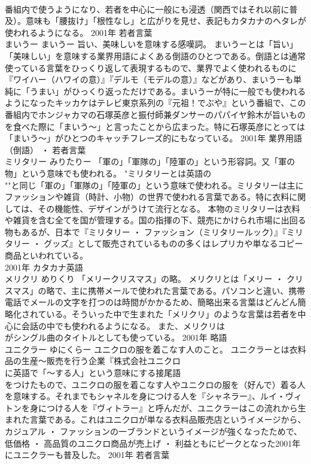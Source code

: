 \documentclass[8pt]{extreport}
\begin{document}
\begin{CJK}{UTF8}{min}
\\	番組内で使うようになり、若者を中心に一般にも浸透（関西ではそれ以前に普及）。意味も「腰抜け」「根性なし」と広がりを見せ、表記もカタカナのヘタレが使われるようになる。	2001年	若者言葉	
\\	まいうー	まいうー	旨い、美味しいを意味する感嘆詞。	まいうーとは「旨い」「美味しい」を意味する業界用語によくある倒語のひとつである。倒語とは通常使っている言葉をひっくり返して表現するもので、業界でよく使われるものに『ワイハー（ハワイの意）』『デルモ（モデルの意）』などがあり、まいうーも単純に「うまい」がひっくり返っただけである。まいうーが特に一般でも使われるようになったキッカケはテレビ東京系列の『元祖！でぶや』という番組で、この番組内でホンジャカマの石塚英彦と振付師兼ダンサーのパパイヤ鈴木が旨いものを食べた際に「まいう～」と言ったことから広まった。特に石塚英彦にとっては「まいう～」がひとつのキャッチフレーズ的にもなっている。	2001年	業界用語（倒語） ・ 若者言葉	
\\	ミリタリー	みりたりー	「軍の」「軍隊の」「陸軍の」という形容詞。又「軍の物」という意味でも使われる。	"ミリタリーとは英語の
\\	""と同じ「軍の」「軍隊の」「陸軍の」という意味で使われる。ミリタリーは主にファッションや雑貨（時計、小物）の世界で使われる言葉である。特に衣料に関しては、その機能性、デザインがうけて流行となる。 本物のミリタリーは衣料や雑貨を含む全てを国が管理する。国の指揮の下、競売にかけられ市場に出回る物もあるが、日本で『ミリタリー ・ ファッション（ミリタリールック）』『ミリタリー ・ グッズ』として販売されているものの多くはレプリカや単なるコピー商品といわれている。
\\	2001年	カタカナ英語	
\\	メリクリ	めりくり	「メリークリスマス」の略。	メリクリとは「メリー ・ クリスマス」の略で、主に携帯メールで使われた言葉である。パソコンと違い、携帯電話でメールの文字を打つのは時間がかかるため、簡略出来る言葉はどんどん簡略化されている。そういった中で生まれた「メリクリ」のような言葉は若者を中心に会話の中でも使われるようになる。 また、メリクリは
\\	がシングル曲のタイトルとしても使っている。	2001年	略語	
\\	ユニクラー	ゆにくらー	ユニクロの服を着こなす人のこと。	ユニクラーとは衣料品の生産～販売を行う企業『株式会社ユニクロ
\\	に英語で「～する人」という意味にする接尾語
\\	をつけたもので、ユニクロの服を着こなす人やユニクロの服を（好んで）着る人を意味する。それまでもシャネルを身につける人を『シャネラー』、ルイ・ヴィトンを身につける人を『ヴィトラー』と呼んだが、ユニクラーはこの流れから生まれた言葉である。これはユニクロが単なる衣料品販売店というイメージから、カジュアル ・ ファッションの一ブランドというイメージが強くなったためで、低価格 ・ 高品質のユニクロ商品が売上げ ・ 利益ともにピークとなった2001年にユニクラーも普及した。	2001年	若者言葉	

\end{CJK}
\end{document}
